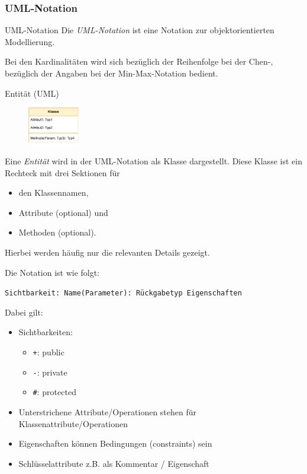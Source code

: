 \subsubsection{UML-Notation}

\begin{defi}{UML-Notation}
    Die \emph{UML-Notation} ist eine Notation zur objektorientierten Modellierung.

    Bei den Kardinalitäten wird sich bezüglich der Reihenfolge bei der Chen-, bezüglich der Angaben bei der Min-Max-Notation bedient.
\end{defi}

\begin{defi}{Entität (UML)}
    \begin{figure}
        \begin{center}
            \includegraphics[width=0.2\textwidth]{includes/figures/definition_uml_entity.pdf}
        \end{center}
    \end{figure}
    Eine \emph{Entität} wird in der UML-Notation als Klasse dargestellt.
    Diese Klasse ist ein Rechteck mit drei Sektionen für
    \begin{itemize}
        \item den Klassennamen,
        \item Attribute (optional) und
        \item Methoden (optional).
    \end{itemize}
    Hierbei werden häufig nur die relevanten Details gezeigt.

    Die Notation ist wie folgt:
    \begin{center}
        \texttt{Sichtbarkeit: Name(Parameter): Rückgabetyp {Eigenschaften}}
    \end{center}

    Dabei gilt:
    \begin{itemize}
        \item Sichtbarkeiten:
              \begin{itemize}
                  \item \texttt{+}: public
                  \item \texttt{-}: private
                  \item \texttt{\#}: protected
              \end{itemize}
        \item Unterstrichene Attribute/Operationen stehen für Klassenattribute/Operationen
        \item Eigenschaften können Bedingungen (constraints) sein
        \item Schlüsselattribute z.B. als Kommentar / Eigenschaft
    \end{itemize}
\end{defi}


